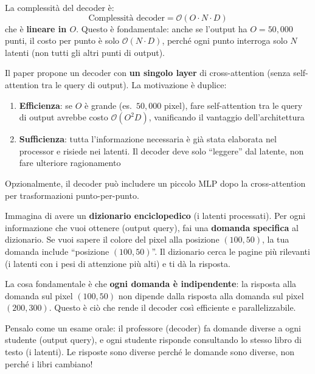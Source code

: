 \documentclass[12pt,a4paper]{article}
\begin{document}
La complessit\`a del decoder \`e:
\[
\text{Complessit\`a decoder} = \mathcal{O}(O \cdot N \cdot D)
\]
che \`e \textbf{lineare in $O$}. Questo \`e fondamentale: anche se l'output ha $O = 50{,}000$ punti, il costo per punto \`e solo $\mathcal{O}(N \cdot D)$, perch\'e ogni punto interroga solo $N$ latenti (non tutti gli altri punti di output).

\begin{notabox}
Il paper propone un decoder con \textbf{un singolo layer} di cross-attention (senza self-attention tra le query di output). La motivazione \`e duplice:
\begin{enumerate}
    \item \textbf{Efficienza}: se $O$ \`e grande (es.\ $50{,}000$ pixel), fare self-attention tra le query di output avrebbe costo $\mathcal{O}(O^2 D)$, vanificando il vantaggio dell'architettura
    \item \textbf{Sufficienza}: tutta l'informazione necessaria \`e gi\`a stata elaborata nel processor e risiede nei latenti. Il decoder deve solo ``leggere'' dal latente, non fare ulteriore ragionamento
\end{enumerate}
Opzionalmente, il decoder pu\`o includere un piccolo MLP dopo la cross-attention per trasformazioni punto-per-punto.
\end{notabox}

\begin{notabox}
Immagina di avere un \textbf{dizionario enciclopedico} (i latenti processati). Per ogni informazione che vuoi ottenere (output query), fai una \textbf{domanda specifica} al dizionario. Se vuoi sapere il colore del pixel alla posizione $(100, 50)$, la tua domanda include ``posizione $(100, 50)$''. Il dizionario cerca le pagine pi\`u rilevanti (i latenti con i pesi di attenzione pi\`u alti) e ti d\`a la risposta.

La cosa fondamentale \`e che \textbf{ogni domanda \`e indipendente}: la risposta alla domanda sul pixel $(100, 50)$ non dipende dalla risposta alla domanda sul pixel $(200, 300)$. Questo \`e ci\`o che rende il decoder cos\`i efficiente e parallelizzabile.

Pensalo come un esame orale: il professore (decoder) fa domande diverse a ogni studente (output query), e ogni studente risponde consultando lo stesso libro di testo (i latenti). Le risposte sono diverse perch\'e le domande sono diverse, non perch\'e i libri cambiano!
\end{notabox}
\end{document}

